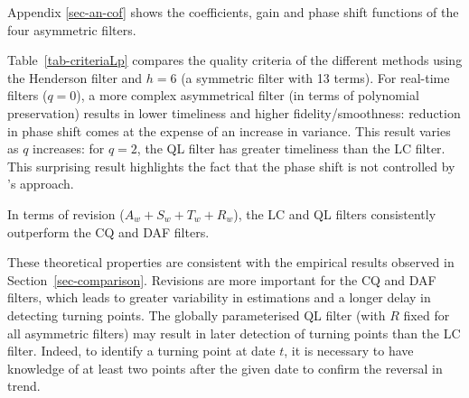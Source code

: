 \documentclass[
]{article}
\newcommand\1{\mathds{1}}
\begin{document}
Appendix \ref{sec-an-cof} shows the coefficients, gain and phase shift
functions of the four asymmetric filters.

Table~\ref{tab-criteriaLp} compares the quality criteria of the
different methods using the Henderson filter and \(h=6\) (a symmetric
filter with 13 terms). For real-time filters (\(q=0\)), a more complex
asymmetrical filter (in terms of polynomial preservation) results in
lower timeliness and higher fidelity/smoothness: reduction in phase
shift comes at the expense of an increase in variance. This result
varies as \(q\) increases: for \(q=2\), the QL filter has greater
timeliness than the LC filter. This surprising result highlights the
fact that the phase shift is not controlled by \textcite{proietti2008}'s
approach.

In terms of revision (\(A_w+S_w+T_w+R_w\)), the LC and QL filters
consistently outperform the CQ and DAF filters.

These theoretical properties are consistent with the empirical results
observed in Section~\ref{sec-comparison}. Revisions are more important
for the CQ and DAF filters, which leads to greater variability in
estimations and a longer delay in detecting turning points. The globally
parameterised QL filter (with \(R\) fixed for all asymmetric filters)
may result in later detection of turning points than the LC filter.
Indeed, to identify a turning point at date \(t\), it is necessary to
have knowledge of at least two points after the given date to confirm
the reversal in trend.
\end{document}
